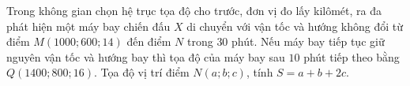 \begin{bt}%
	Trong không gian chọn hệ trục tọa độ cho trước, đơn vị đo lấy kilômét, ra đa phát 
	hiện một máy bay chiến đấu $X$ di chuyển với vận tốc và hướng không đổi từ điểm $M\left(1000;600;14 \right)$ đến điểm $N$ trong $30$ phút. Nếu máy bay tiếp tục giữ nguyên vận tốc và hướng bay thì tọa độ của máy bay sau $10$ phút tiếp theo bằng $Q\left(1400;800;16 \right)$. Tọa độ vị trí điểm $N\left(a;b;c \right)$, tính 
	$S=a+b+2c$.
\end{bt}

